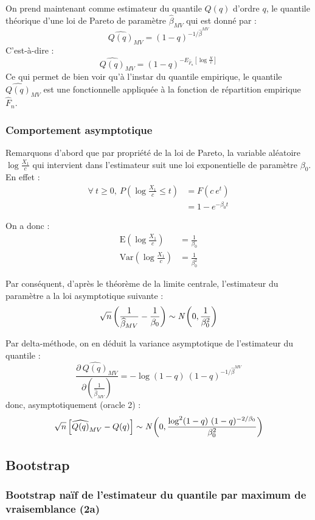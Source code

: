 \documentclass{article}
\renewcommand*{\(}{ \left( }
\renewcommand*{\)}{ \right) }
\begin{document}
On prend maintenant comme estimateur du quantile $Q(q)$ d'ordre $q$, le quantile théorique d'une loi de Pareto de paramètre $\widehat{\beta}_{MV}$ qui est donné par :
\[ \widehat{Q(q)}_{MV} = (1-q)^{-1/\widehat{\beta}^{MV}} \]
C'est-à-dire :
\[ \widehat{Q(q)}_{MV} = (1-q)^{- E_{\hat{F}_n} \left[ \log \frac{X}{c} \right] } \]
Ce qui permet de bien voir qu'à l'instar du quantile empirique, le quantile $\widehat{Q(q)}_{MV}$ est une fonctionnelle appliquée à la fonction de répartition empirique $\hat{F}_n$.

\subsubsection{Comportement asymptotique}

Remarquons d'abord que par propriété de la loi de Pareto, la variable aléatoire $ \log \frac{X_1}{c} $ qui intervient dans l'estimateur suit une loi exponentielle de paramètre $\beta_0$. En effet :
\begin{align*}
\forall\ t \geq 0, \ P(\log \frac{X_1}{c} \leq t) &= F(c \ e^t) \\
&= 1 - e^{-\beta_0 t}
\end{align*}

On a donc :
\begin{align*}
\text{E} \left( \log \frac{X_{1}}{c} \right) &= \frac{1}{\beta_0} \\
\text{Var} \left( \log \frac{X_{1}}{c} \right) &= \frac{1}{\beta_0^2}
\end{align*}

Par conséquent, d'après le théorème de la limite centrale, l'estimateur du paramètre a la loi asymptotique suivante : 
\[ \sqrt{n} \left( \frac{1}{\widehat{\beta}_{MV}} - \frac{1}{\beta_0} \right) \sim \emph{N} \left( 0, \frac{1}{\beta_0^2} \right) \]

Par delta-méthode, on en déduit la variance asymptotique de l'estimateur du quantile :
\[ \frac{\partial \ \widehat{Q(q)}_{MV}} {\partial (\frac{1}{\widehat{\beta}_{MV}}) } = -\log(1-q)\ (1-q)^{-1/\widehat{\beta}^{MV}} \]
donc, asymptotiquement (oracle 2) :
\[ \label{var2} \sqrt{n} \left[ \widehat{Q(q)}_{MV} - Q(q) \right] \sim \emph{N} \left( 0, \frac{\log^2(1-q)\ (1-q)^{-2/\beta_0}}{\beta_0^2}  \right) \]

\subsection{Bootstrap}

\subsubsection{Bootstrap naïf de l'estimateur du quantile par maximum de vraisemblance (2a)}
\end{document}
